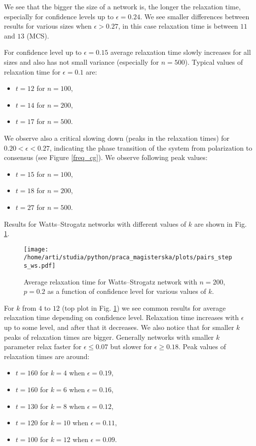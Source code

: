 \documentclass[a4paper, 12pt]{article}
\begin{document}
We see that the bigger the size of a network is, the longer the relaxation time, especially for confidence levels up to $\epsilon=0.24$. We see smaller differences between results for various sizes when $\epsilon > 0.27$, in this case relaxation time is between $11$ and $13$ (MCS). 
\indent

For confidence level up to $\epsilon=0.15$ average relaxation time slowly increases for all sizes and also has not small variance (especially for $n=500$). Typical values of relaxation time for $\epsilon=0.1$ are:
\begin{itemize}
\item $t=12$ for $n=100$,
\item $t=14$ for $n=200$,
\item $t=17$ for $n=500$.
\end{itemize}
We observe also a critical slowing down (peaks in the relaxation times) for $0.20<\epsilon<0.27$, indicating the phase transition of the system from polarization to consensus (see Figure \ref{freq_cg}). We observe following peak values:
\begin{itemize}
\item $t=15$ for $n=100$,
\item $t=18$ for $n=200$, 
\item $t=27$ for $n=500$.
\end{itemize}

\indent

Results for Watts--Strogatz networks with different values of $k$ are shown in Fig. \ref{f32}.

\begin{figure}[H]
		\centering
		\texttt{[image: /home/arti/studia/python/praca\_magisterska/plots/pairs\_steps\_ws.pdf]}
		\caption{Average relaxation time for Watts--Strogatz network with $n=200$, $p=0.2$ as a function of confidence level for various values of $k$.}
		\label{f32}
\end{figure}

For $k$ from $4$ to $12$ (top plot in Fig. \ref{f32}) we see common results for average relaxation time depending on confidence level. Relaxation time increases with $\epsilon$ up to some level, and after that it decreases. We also notice that for smaller $k$ peaks of relaxation times are bigger. Generally networks with smaller $k$ parameter relax faster for $\epsilon \leq 0.07$ but slower for $\epsilon \geq 0.18$. Peak values of relaxation times are around:
\begin{itemize}
\item $t=160$ for $k=4$ when $\epsilon=0.19$,
\item $t=160$ for $k=6$ when $\epsilon=0.16$,
\item $t=130$ for $k=8$ when $\epsilon=0.12$,
\item $t=120$ for $k=10$ when $\epsilon=0.11$,
\item $t=100$ for $k=12$ when $\epsilon=0.09$.
\end{itemize} 
\end{document}
